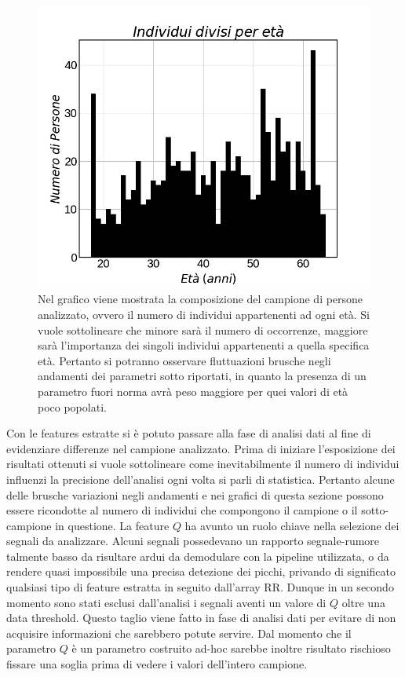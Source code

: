 \documentclass[a4paper, 12pt]{book}
\begin{document}
\begin{figure}[h!]
	\centering
	\includegraphics[width=\textwidth]{campione-age.jpg}
	\caption{Nel grafico viene mostrata la composizione del campione di persone analizzato, ovvero il numero di individui appartenenti ad ogni età.
Si vuole sottolineare che minore sarà il numero di occorrenze, maggiore sarà l'importanza dei singoli individui appartenenti a quella specifica età.
Pertanto si potranno osservare fluttuazioni brusche negli andamenti dei parametri sotto riportati, in quanto la presenza di un parametro fuori norma avrà peso maggiore per quei valori di età poco popolati.}
	\label{fig:campione-age}
\end{figure}


Con le features estratte si è potuto passare alla fase di analisi dati al fine di evidenziare differenze nel campione analizzato.
Prima di iniziare l'esposizione dei risultati ottenuti si vuole sottolineare come inevitabilmente il numero di individui influenzi la precisione dell'analisi ogni volta si parli di statistica.
Pertanto alcune delle brusche variazioni negli andamenti e nei grafici di questa sezione possono essere ricondotte al numero di individui che compongono il campione o il sotto-campione in questione.
La feature $Q$ ha avunto un ruolo chiave nella selezione dei segnali da analizzare. 
Alcuni segnali possedevano un rapporto segnale-rumore talmente basso da risultare ardui da demodulare con la pipeline utilizzata, o da rendere quasi impossibile una precisa detezione dei picchi, privando di significato qualsiasi tipo di feature estratta in seguito dall'array RR.
Dunque in un secondo momento sono stati esclusi dall'analisi i segnali aventi un valore di $Q$ oltre una data threshold.
Questo taglio viene fatto in fase di analisi dati per evitare di non acquisire informazioni che sarebbero potute servire.
Dal momento che il parametro $Q$ è un parametro costruito ad-hoc sarebbe inoltre risultato rischioso fissare una soglia prima di vedere i valori dell'intero campione.
\newline
\end{document}
